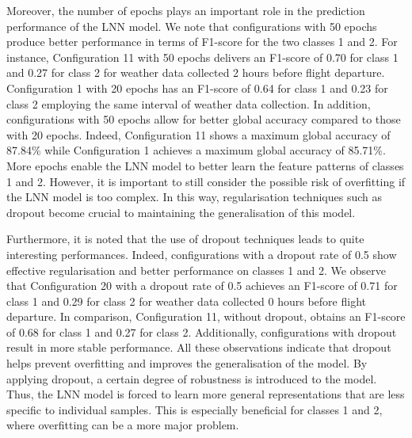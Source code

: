 \documentclass[12pt,oneside]{book} %
\begin{document}
\noindent Moreover, the number of epochs plays an important role in the prediction performance of the LNN model. We note that configurations with 50 epochs produce better performance in terms of F1-score for the two classes 1 and 2. For instance, Configuration 11 with 50 epochs delivers an F1-score of 0.70 for class 1 and 0.27 for class 2 for weather data collected 2 hours before flight departure. Configuration 1 with 20 epochs has an F1-score of 0.64 for class 1 and 0.23 for class 2 employing the same interval of weather data collection. In addition, configurations with 50 epochs allow for better global accuracy compared to those with 20 epochs. Indeed, Configuration 11 shows a maximum global accuracy of 87.84\% while Configuration 1 achieves a maximum global accuracy of 85.71\%. More epochs enable the LNN model to better learn the feature patterns of classes 1 and 2. However, it is important to still consider the possible risk of overfitting if the LNN model is too complex. In this way, regularisation techniques such as dropout become crucial to maintaining the generalisation of this model.

\noindent Furthermore, it is noted that the use of dropout techniques leads to quite interesting performances. Indeed, configurations with a dropout rate of 0.5 show effective regularisation and better performance on classes 1 and 2. We observe that Configuration 20 with a dropout rate of 0.5 achieves an F1-score of 0.71 for class 1 and 0.29 for class 2 for weather data collected 0 hours before flight departure. In comparison, Configuration 11, without dropout, obtains an F1-score of 0.68 for class 1 and 0.27 for class 2. Additionally, configurations with dropout result in more stable performance. All these observations indicate that dropout helps prevent overfitting and improves the generalisation of the model. By applying dropout, a certain degree of robustness is introduced to the model. Thus, the LNN model is forced to learn more general representations that are less specific to individual samples. This is especially beneficial for classes 1 and 2, where overfitting can be a more major problem.
\end{document}

